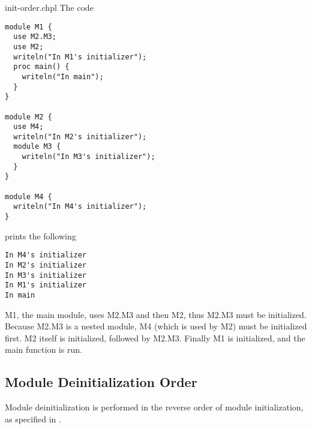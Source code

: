 \begin{chapelexample}{init-order.chpl}
The code
\begin{chapel}
\begin{verbatim}
module M1 {
  use M2.M3;
  use M2;
  writeln("In M1's initializer");
  proc main() {
    writeln("In main");
  }
}

module M2 {
  use M4;
  writeln("In M2's initializer");
  module M3 {
    writeln("In M3's initializer");
  }
}

module M4 {
  writeln("In M4's initializer");
}
\end{verbatim}
\end{chapel}
prints the following
\begin{chapelprintoutput}
\begin{verbatim}
In M4's initializer
In M2's initializer
In M3's initializer
In M1's initializer
In main
\end{verbatim}
\end{chapelprintoutput}
M1, the main module, uses M2.M3 and then M2, thus M2.M3 must be
initialized.  Because M2.M3 is a nested module, M4 (which is used by
M2) must be initialized first.  M2 itself is initialized, followed by
M2.M3.  Finally M1 is initialized, and the main function is run.
\end{chapelexample}


\subsection{Module Deinitialization Order}
\label{Module_Deinitialization_Order}

Module deinitialization is performed in the reverse order of
module initialization, as specified in
.

